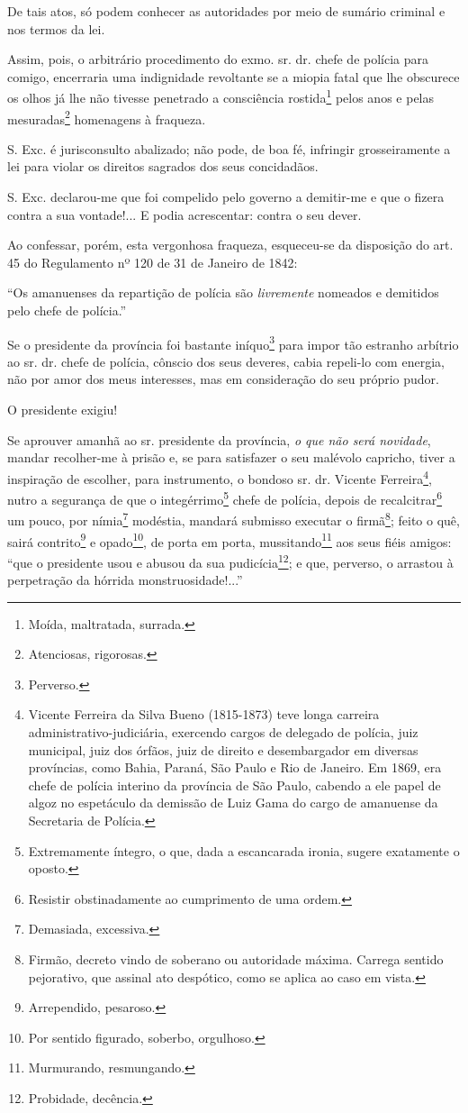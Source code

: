De tais atos, só podem conhecer as autoridades por meio de sumário
criminal e nos termos da lei.

Assim, pois, o arbitrário procedimento do exmo. sr. dr. chefe de polícia
para comigo, encerraria uma indignidade revoltante se a miopia fatal que
lhe obscurece os olhos já lhe não tivesse penetrado a consciência
rostida\footnote{Moída, maltratada, surrada.} pelos anos e pelas
mesuradas\footnote{Atenciosas, rigorosas.} homenagens à fraqueza.

S. Exc. é jurisconsulto abalizado; não pode, de boa fé, infringir
grosseiramente a lei para violar os direitos sagrados dos seus
concidadãos.

S. Exc. declarou-me que foi compelido pelo governo a demitir-me e que o
fizera contra a sua vontade!... E podia acrescentar: contra o seu dever.

Ao confessar, porém, esta vergonhosa fraqueza, esqueceu-se da disposição
do art. 45 do Regulamento nº 120 de 31 de Janeiro de 1842:

``Os amanuenses da repartição de polícia são \emph{livremente} nomeados e
demitidos pelo chefe de polícia.''

Se o presidente da província foi bastante iníquo\footnote{Perverso.}
para impor tão estranho arbítrio ao sr. dr. chefe de polícia, cônscio
dos seus deveres, cabia repeli-lo com energia, não por amor dos meus
interesses, mas em consideração do seu próprio pudor.

O presidente exigiu!

Se aprouver amanhã ao sr. presidente da província, \emph{o que não será
novidade}, mandar recolher-me à prisão e, se para satisfazer o seu
malévolo capricho, tiver a inspiração de escolher, para instrumento, o
bondoso sr. dr. Vicente Ferreira\footnote{Vicente Ferreira da Silva
  Bueno (1815-1873) teve longa carreira administrativo-judiciária,
  exercendo cargos de delegado de polícia, juiz municipal, juiz dos
  órfãos, juiz de direito e desembargador em diversas províncias, como
  Bahia, Paraná, São Paulo e Rio de Janeiro. Em 1869, era chefe de
  polícia interino da província de São Paulo, cabendo a ele papel de
  algoz no espetáculo da demissão de Luiz Gama do cargo de amanuense da
  Secretaria de Polícia.}, nutro a segurança de que o
integérrimo\footnote{Extremamente íntegro, o que, dada a escancarada
  ironia, sugere exatamente o oposto.} chefe de polícia, depois de
recalcitrar\footnote{Resistir obstinadamente ao cumprimento de uma
  ordem.} um pouco, por nímia\footnote{Demasiada, excessiva.}
modéstia, mandará submisso executar o firmã\footnote{Firmão, decreto
  vindo de soberano ou autoridade máxima. Carrega sentido pejorativo,
  que assinal ato despótico, como se aplica ao caso em vista.}; feito o
quê, sairá contrito\footnote{Arrependido, pesaroso.} e
opado\footnote{Por sentido figurado, soberbo, orgulhoso.}, de porta em
porta, mussitando\footnote{Murmurando, resmungando.} aos seus fiéis
amigos: ``que o presidente usou e abusou da sua pudicícia\footnote{
  Probidade, decência.}; e que, perverso, o arrastou à perpetração da
hórrida monstruosidade!...''

